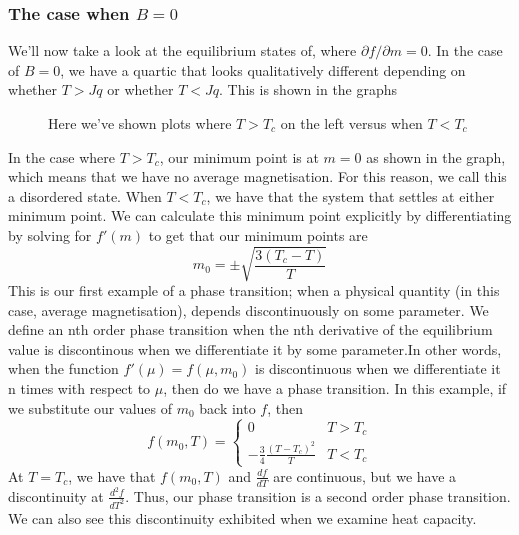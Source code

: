 \documentclass[11pt, oneside]{article}   	%
\begin{document}
\subsubsection*{The case when $ B = 0 $}
We'll now take a look at the equilibrium states of, where $ \partial f / \partial m  =0 $. In the case of $B = 0 $, we have a quartic that looks qualitatively different depending on whether $ T > Jq $ or whether $T < Jq $. This is shown in the graphs 
\begin{figure}
	\centering 
	\quad 

	\caption{ Here we've shown plots where $T > T_c$ on the left versus when $T< T_c$} 
\end{figure} 
In the case where $T > T_c $, our minimum point is at $m = 0$ as shown in the graph, which means that we have no average magnetisation. For this reason, we call this a disordered state. 
When $T < T_c$, we have that the system that settles at either minimum point. We can calculate this minimum point explicitly by differentiating by solving for $f'(m ) $ to get that our minimum points are 
\[ 
m_0 = \pm \sqrt{ \frac{ 3 ( T_c - T ) }{ T } } 
\] 
This is our first example of a phase transition; when a physical quantity (in this case, average magnetisation), depends discontinuously on some parameter. We define an nth order phase transition when the nth derivative of the equilibrium value is discontinous when we differentiate it by some parameter.In other words, when the function $f'(\mu) = f( \mu, m_0 )$ is discontinuous when we differentiate it n times with respect to $\mu$, then do we have a phase transition. In this example, if we substitute our values of $m_0$ back into $f$, then 
\[ 
f(m_0, T) = \begin{cases} 
		0 & T > T_c \\ 
		 - \frac{3}{ 4} \frac{ ( T - T_c)^2 }{ T }  & T< T_c 			\end{cases} 
\] 
At $ T = T_c$, we have that $f( m_0, T )$ and $\frac{ df }{ dT } $ are continuous, but we have a discontinuity at $\frac{ d^2 f}{ dT^2 } $. 
Thus, our phase transition is a second order phase transition. 
We can also see this discontinuity exhibited when we examine heat capacity. 
\end{document}
